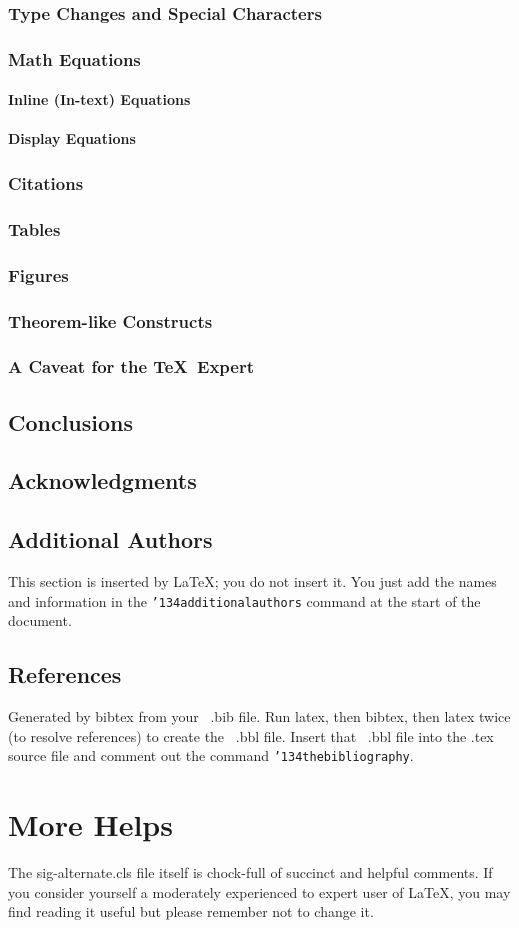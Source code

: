 \documentclass{sig-alternate}
\begin{document}
\subsubsection{Type Changes and  Special Characters}
\subsubsection{Math Equations}
\paragraph{Inline (In-text) Equations}
\paragraph{Display Equations}
\subsubsection{Citations}
\subsubsection{Tables}
\subsubsection{Figures}
\subsubsection{Theorem-like Constructs}
\subsubsection*{A Caveat for the \TeX\ Expert}
\subsection{Conclusions}
\subsection{Acknowledgments}
\subsection{Additional Authors}
This section is inserted by \LaTeX; you do not insert it.
You just add the names and information in the
\texttt{{\char'134}additionalauthors} command at the start
of the document.
\subsection{References}
Generated by bibtex from your ~.bib file.  Run latex,
then bibtex, then latex twice (to resolve references)
to create the \cite{mur} ~.bbl file. \cite{roadalarm} Insert that ~.bbl file into
the .tex source file and comment out
the command \texttt{{\char'134}thebibliography}.
\section{More Helps}
The sig-alternate.cls file itself is chock-full of succinct
and helpful comments.  If you consider yourself a moderately
experienced to expert user of \LaTeX, you may find reading
it useful but please remember not to change it.
\end{document}
